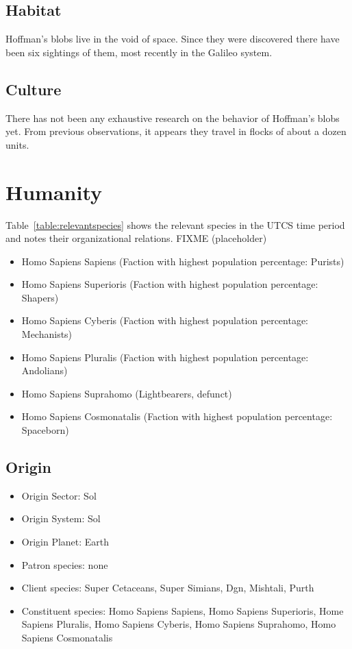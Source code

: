 \subsection{Habitat}
Hoffman's blobs live in the void of space. Since they were discovered
there have been six sightings of them, most recently in the Galileo
system.

\subsection{Culture}
There has not been any exhaustive research on the behavior of
Hoffman's blobs yet. From previous observations, it appears they
travel in flocks of about a dozen units.

\section{Humanity}

Table~\ref{table:relevantspecies} shows the relevant species in the UTCS time period and notes their organizational relations. FIXME (placeholder)

\begin{itemize}
\item	Homo Sapiens Sapiens (Faction with highest population percentage: Purists)
\item	Homo Sapiens Superioris (Faction with highest population percentage: Shapers)
\item	Homo Sapiens Cyberis (Faction with highest population percentage: Mechanists)
\item	Homo Sapiens Pluralis (Faction with highest population percentage: Andolians)
\item	Homo Sapiens Suprahomo (Lightbearers, defunct)
\item	Homo Sapiens Cosmonatalis (Faction with highest population percentage: Spaceborn)
\end{itemize}

\subsection{Origin}
\begin{itemize}
\item Origin Sector: Sol
\item Origin System: Sol
\item Origin Planet: Earth
\item Patron species: none
\item Client species: Super Cetaceans,  Super Simians, Dgn, Mishtali, Purth
\item Constituent species: Homo Sapiens Sapiens, Homo Sapiens Superioris, Home Sapiens Pluralis, Homo Sapiens Cyberis, Homo Sapiens Suprahomo, Homo Sapiens Cosmonatalis
\end{itemize}

